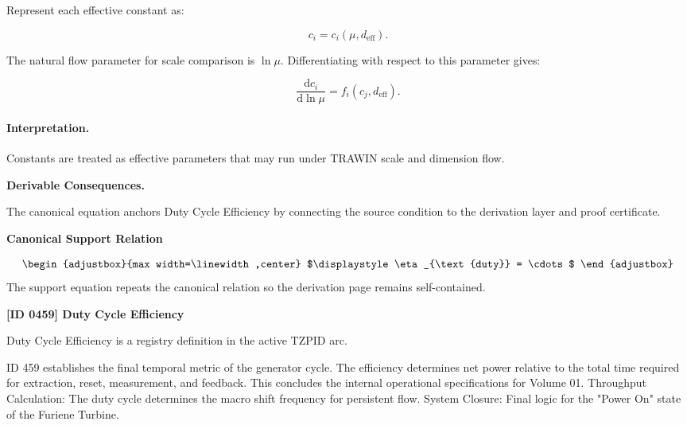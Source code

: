 Represent each effective constant as:

\begin{equation}
c_i=c_i(\mu,d_{\mathrm{eff}}).
\end{equation}

The natural flow parameter for scale comparison is $\ln\mu$.  
Differentiating with respect to this parameter gives:

\begin{equation}
\boxed{
\frac{\mathrm{d}c_i}{\mathrm{d}\ln\mu}
=
f_i(c_j,d_{\mathrm{eff}}).
}
\end{equation}

\paragraph{Interpretation.}
Constants are treated as effective parameters that may run under TRAWIN scale and dimension flow.

\par\vspace{0.35em}
\noindent\textbf{Derivable Consequences.}\quad
\begingroup
\footnotesize
\raggedright
The canonical equation anchors Duty Cycle Efficiency by connecting the source condition to the derivation layer and proof certificate.
\par\endgroup

\noindent\textbf{Canonical Support Relation}\par
\[
\begin{adjustbox}{max width=\linewidth,center}
$\displaystyle
\eta_{\text{duty}} = \cdots
$
\end{adjustbox}
\]
\noindent The support equation repeats the canonical relation so the derivation page remains self-contained.\par

\clearpage
\noindent\textbf{[ID 0459] Duty Cycle Efficiency}\par
\vspace{0.35em}
\begingroup\small
{}
Duty Cycle Efficiency is a registry definition in the active TZPID arc.

ID 459 establishes the final temporal metric of the generator cycle. The efficiency determines net power relative to the total time required for extraction, reset, measurement, and feedback. This concludes the internal operational specifications for Volume 01. Throughput Calculation: The duty cycle determines the macro shift frequency for persistent flow. System Closure: Final logic for the "Power On" state of the Furiene Turbine.

